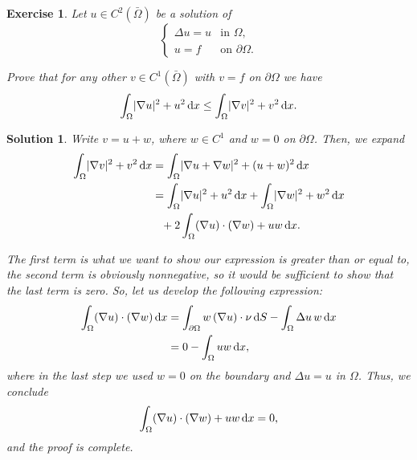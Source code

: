 \documentclass{article}
\newtheorem{ex}{Exercise}
\theoremstyle{nonumberplain}
\newtheorem{sol}{Solution}
\DeclarePairedDelimiter{\abs}{\lvert}{\rvert}
\newcommand{\lap}{\Delta}
\newcommand{\grad}{\nabla}
\begin{document}
\begin{ex}
Let $u \in C^2(\bar\Omega)$ be a solution of
\begin{equation}
\begin{cases}
\lap u = u & \text{in $\Omega$,}\\
u = f & \text{on $\partial\Omega$.}
\end{cases}
\end{equation}

Prove that for any other $v \in C^1(\bar\Omega)$ with $v = f$ on $\partial\Omega$ we have
\begin{equation}
\int_\Omega \abs{\grad u}^2 + u^2 \dl x \leq \int_\Omega \abs{\grad v}^2 + v^2 \dl x.
\end{equation}
\end{ex}

\begin{sol}
Write $v = u + w$, where $w \in C^1$ and $w = 0$ on $\partial\Omega$. Then, we expand
\begin{equation}
\begin{aligned}
\int_\Omega \abs{\grad v}^2 + v^2 \dl x 
&= \int_\Omega \abs{\grad u + \grad w}^2 + (u+w)^2 \dl x\\
&= \int_\Omega \abs{\grad u}^2 + u^2 \dl x + \int_\Omega \abs{\grad w}^2 + w^2 \dl x \\
&\phantom{= }+ 2 \int_\Omega (\grad u) \cdot (\grad w) + uw \dl x.
\end{aligned}
\end{equation}

The first term is what we want to show our expression is greater than or equal to, the second term is obviously nonnegative, so it would be sufficient to show that the last term is zero. So, let us develop the following expression:
\begin{equation}
\begin{aligned}
\int_\Omega (\grad u) \cdot (\grad w) \dl x
&= \int_{\partial \Omega} w \, (\grad u) \cdot \nu \dl S - \int_\Omega \lap u \, w \dl x\\
&= 0 - \int_\Omega u w \dl x,
\end{aligned}
\end{equation}
where in the last step we used $w = 0$ on the boundary and $\lap u = u$ in $\Omega$. Thus, we conclude
\begin{equation}
\int_\Omega (\grad u) \cdot (\grad w) + uw \dl x = 0,
\end{equation}
and the proof is complete.
\end{sol}
\end{document}
